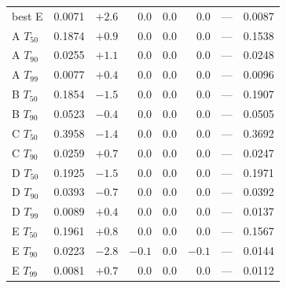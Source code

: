 \begin{tabular}{lrrrrrrr}
best E & 0.0071 & $+2.6$ & $0.0$ & $0.0$ & $0.0$ & --- & 0.0087\\
A $T_{50}$ & 0.1874 & $+0.9$ & $0.0$ & $0.0$ & $0.0$ & --- & 0.1538\\
A $T_{90}$ & 0.0255 & $+1.1$ & $0.0$ & $0.0$ & $0.0$ & --- & 0.0248\\
A $T_{99}$ & 0.0077 & $+0.4$ & $0.0$ & $0.0$ & $0.0$ & --- & 0.0096\\
B $T_{50}$ & 0.1854 & $-1.5$ & $0.0$ & $0.0$ & $0.0$ & --- & 0.1907\\
B $T_{90}$ & 0.0523 & $-0.4$ & $0.0$ & $0.0$ & $0.0$ & --- & 0.0505\\
C $T_{50}$ & 0.3958 & $-1.4$ & $0.0$ & $0.0$ & $0.0$ & --- & 0.3692\\
C $T_{90}$ & 0.0259 & $+0.7$ & $0.0$ & $0.0$ & $0.0$ & --- & 0.0247\\
D $T_{50}$ & 0.1925 & $-1.5$ & $0.0$ & $0.0$ & $0.0$ & --- & 0.1971\\
D $T_{90}$ & 0.0393 & $-0.7$ & $0.0$ & $0.0$ & $0.0$ & --- & 0.0392\\
D $T_{99}$ & 0.0089 & $+0.4$ & $0.0$ & $0.0$ & $0.0$ & --- & 0.0137\\
E $T_{50}$ & 0.1961 & $+0.8$ & $0.0$ & $0.0$ & $0.0$ & --- & 0.1567\\
E $T_{90}$ & 0.0223 & $-2.8$ & $-0.1$ & $0.0$ & $-0.1$ & --- & 0.0144\\
E $T_{99}$ & 0.0081 & $+0.7$ & $0.0$ & $0.0$ & $0.0$ & --- & 0.0112\\
\bottomrule\end{tabular}
